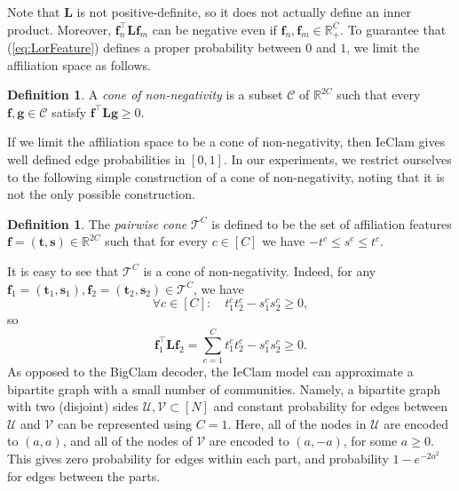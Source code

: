 \documentclass{article}
\theoremstyle{plain}
\theoremstyle{definition}
\newtheorem{definition}[theorem]{Definition}
\theoremstyle{remark}
\newcommand{\ron}[1]{{{\textcolor{red}{\textbf{[Ron:} {#1}\textbf{]}}}}}
\begin{document}
Note that $\mathbf{L}$ is not positive-definite, so it does not actually define an inner product. Moreover, $\mathbf{f}_n^\top  \mathbf{L} \mathbf{f}_m$ can be negative even if $\mathbf{f}_n,\mathbf{f}_m\in \mathbb{R}_+^C$. To guarantee that (\ref{eq:LorFeature}) defines a proper probability between $0$ and $1$, we limit the affiliation space as follows.  
%
\begin{definition}
  A \emph{cone of non-negativity} is a  subset $\mathcal{C}$ of $\mathbb{R}^{2C}$ such that every $\mathbf{f},\mathbf{g}\in \mathcal{C}$ satisfy
$\mathbf{f}^\top  \mathbf{L} \mathbf{g} \geq 0$.  
\end{definition}
If we limit the affiliation space to be a cone of non-negativity, then IeClam gives well defined edge probabilities in $[0,1]$.
In our experiments, we restrict ourselves to the following simple construction of a cone of non-negativity, noting that it is not the only possible construction. 
%
\begin{definition}
 The \emph{pairwise cone} $\mathcal{T}^C$ is defined to be the set of affiliation features $\mathbf{f}=(\mathbf{t},\mathbf{s})\in\mathbb{R}^{2C}$ such that for every $c\in[C]$ we have $-t^c \leq s^c\leq t^c$.    
\end{definition}
It is easy to see that $\mathcal{T}^C$ is a cone of non-negativity. Indeed, for any $\mathbf{f}_1=(\mathbf{t}_1,\mathbf{s}_1), \mathbf{f}_2=(\mathbf{t}_2,\mathbf{s}_2) \in \mathcal{T}^C$,  we have  
 \[\forall c\in[C]: \quad  t_1^c t_2^c - s_1^c s_2^c \geq 0,\] so
\[\mathbf{f}_1^\top  \mathbf{L} \mathbf{f}_2 = \sum_{c=1}^C t_1^c t_2^c - s_1^c s_2^c \geq 0.\] 
%
%
As opposed to the BigClam decoder, the IeClam model can approximate a bipartite graph with a small number of communities. Namely, a bipartite graph with two (disjoint) sides $\mathcal{U},\mathcal{V}\subset[N]$ and constant probability for edges between $\mathcal{U}$ and $\mathcal{V}$ can be represented using $C=1$. Here,  all of the nodes in $\mathcal{U}$ are encoded to $(a,a)$,  and all of the nodes of $\mathcal{V}$ are encoded to $(a,-a)$, for some $a\geq 0$. This gives zero probability for edges within each part, and probability $1- e^{-2a^2}$ for edges between the parts. %
\end{document}
